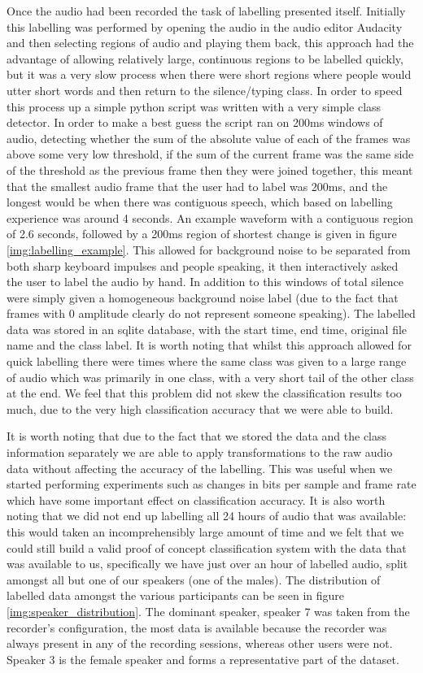 \documentclass[ %
                    author={Sam Phippen},
                supervisor={Dr. Rafal Bogacz},
                     title={Real time voice activity detectors in noisy personal computing environments},
                  subtitle={},
                    degree={MEng},
                      year={2012} ]{thesis}
\begin{document}
Once the audio had been recorded the task of labelling presented itself.
Initially this labelling was performed by opening the audio in the audio editor
Audacity\cite{audacity} and then selecting regions of audio and playing them
back, this approach had the advantage of allowing relatively large, continuous
regions to be labelled quickly, but it was a very slow process when there were
short regions where people would utter short words and then return to the
silence/typing class. In order to speed this process up a simple python script
was written with a very simple class detector. In order to make a best guess
the script ran on 200ms windows of audio, detecting whether the sum of the
absolute value of each of the frames was above some very low threshold, if the
sum of the current frame was the same side of the threshold as the previous
frame then they were joined together, this meant that the smallest audio frame
that the user had to label was 200ms, and the longest would be when there was
contiguous speech, which based on labelling experience was around 4 seconds. An
example waveform with a contiguous region of 2.6 seconds, followed by a 200ms
region of shortest change is given in figure \ref{img:labelling_example}. This
allowed for background noise to be separated from both sharp keyboard impulses
and people speaking, it then interactively asked the user to label the audio by
hand. In addition to this windows of total silence were simply given a
homogeneous background noise label (due to the fact that frames with 0
amplitude clearly do not represent someone speaking). The labelled data was
stored in an sqlite database, with the start time, end time, original file name
and the class label. It is worth noting that whilst this approach allowed for
quick labelling there were times where the same class was given to a large
range of audio which was primarily in one class, with a very short tail of the
other class at the end. We feel that this problem did not skew the
classification results too much, due to the very high classification accuracy
that we were able to build.

It is worth noting that due to the fact that we stored the data and the class
information separately we are able to apply transformations to the raw audio
data without affecting the accuracy of the labelling. This was useful when we
started performing experiments such as changes in bits per sample and frame
rate which have some important effect on classification accuracy. It is also
worth noting that we did not end up labelling all 24 hours of audio that was
available: this would taken an incomprehensibly large amount of time and we
felt that we could still build a valid proof of concept classification system
with the data that was available to us, specifically we have just over an hour
of labelled audio, split amongst all but one of our speakers (one of the
males). The distribution of labelled data amongst the various participants can
be seen in figure \ref{img:speaker_distribution}. The dominant speaker, speaker
7 was taken from the recorder's configuration, the most data is available
because the recorder was always present in any of the recording sessions,
whereas other users were not. Speaker 3 is the female speaker and forms a
representative part of the dataset.
\end{document}

